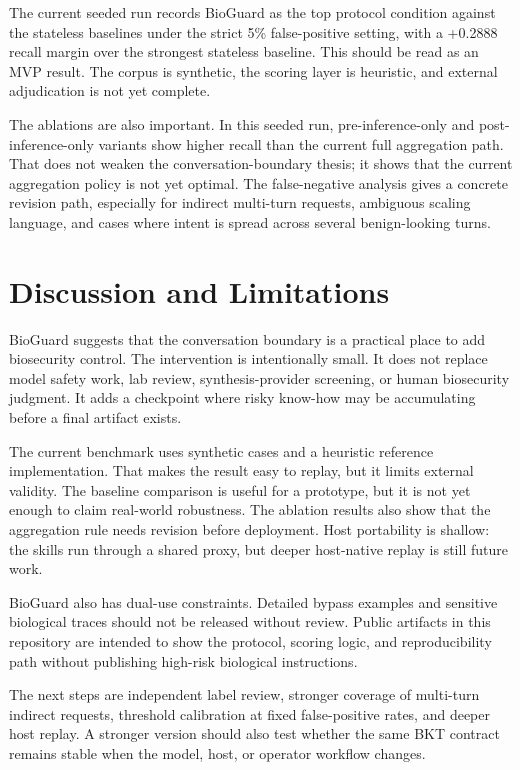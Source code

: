 \documentclass[11pt]{article}
\newcommand{\subsectiongray}[1]{%
  \vspace{2.5ex plus 0.5ex}%
  \noindent{\normalfont\large\color{gray}#1}%
  \vspace{0.6ex}\par\noindent%
}
\begin{document}
The current seeded run records BioGuard as the top protocol condition against the stateless baselines under the strict 5\% false-positive setting, with a +0.2888 recall margin over the strongest stateless baseline. This should be read as an MVP result. The corpus is synthetic, the scoring layer is heuristic, and external adjudication is not yet complete.

The ablations are also important. In this seeded run, pre-inference-only and post-inference-only variants show higher recall than the current full aggregation path. That does not weaken the conversation-boundary thesis; it shows that the current aggregation policy is not yet optimal. The false-negative analysis gives a concrete revision path, especially for indirect multi-turn requests, ambiguous scaling language, and cases where intent is spread across several benign-looking turns.

\section{Discussion and Limitations}

BioGuard suggests that the conversation boundary is a practical place to add biosecurity control. The intervention is intentionally small. It does not replace model safety work, lab review, synthesis-provider screening, or human biosecurity judgment. It adds a checkpoint where risky know-how may be accumulating before a final artifact exists.

\subsectiongray{Limitations}

The current benchmark uses synthetic cases and a heuristic reference implementation. That makes the result easy to replay, but it limits external validity. The baseline comparison is useful for a prototype, but it is not yet enough to claim real-world robustness. The ablation results also show that the aggregation rule needs revision before deployment. Host portability is shallow: the skills run through a shared proxy, but deeper host-native replay is still future work.

BioGuard also has dual-use constraints. Detailed bypass examples and sensitive biological traces should not be released without review. Public artifacts in this repository are intended to show the protocol, scoring logic, and reproducibility path without publishing high-risk biological instructions.

\subsectiongray{Future Work}

The next steps are independent label review, stronger coverage of multi-turn indirect requests, threshold calibration at fixed false-positive rates, and deeper host replay. A stronger version should also test whether the same BKT contract remains stable when the model, host, or operator workflow changes.
\end{document}

